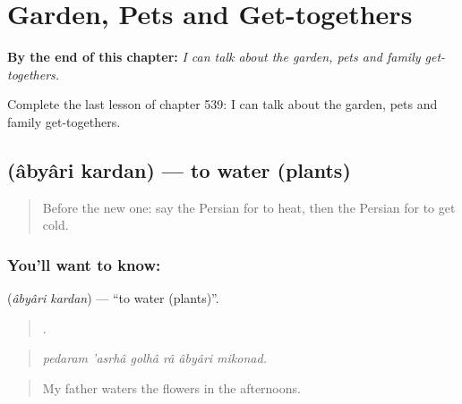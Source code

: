 
\chapter{Garden, Pets and Get-togethers}
\label{ch:fa-garden-pets-and-get-togethers}

\begin{chapteropening}
\textbf{By the end of this chapter:} \emph{I can talk about the garden, pets and family get-togethers.}

Complete the last lesson of chapter 539: I can talk about the garden, pets and family get-togethers.
\end{chapteropening}

\section[\texorpdfstring{\fa{آبیاری} \fa{کردن} (âbyâri kardan)}{آبیاری کردن (âbyâri kardan)}]{  (âbyâri kardan) — to water (plants)}

\label{lesson:FA-C539-abyari-kardan}



\begin{quote}
Before the new one: say the Persian for to heat, then the Persian for to get cold.
\end{quote}

\subsection*{You'll want to know:  }
\textbf{ } (\emph{âbyâri kardan}) — \textquotedblleft{}to water (plants)\textquotedblright{}.

\begin{quote}
     .
\end{quote}

\begin{quote}
\emph{pedaram 'asrhâ golhâ râ âbyâri mikonad.}
\end{quote}

\begin{quote}
My father waters the flowers in the afternoons.
\end{quote}

